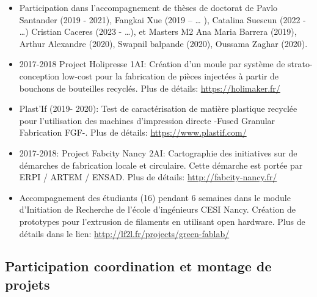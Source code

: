 \documentclass[
  11pt,
]{article}
\begin{document}
\begin{itemize}
\item
  Participation dans l'accompagnement de thèses de doctorat de Pavlo
  Santander (2019 - 2021), Fangkai Xue (2019 -- \ldots{} ), Catalina
  Suescun (2022 - \ldots) Cristian Caceres (2023 - \ldots), et Masters
  M2 Ana Maria Barrera (2019), Arthur Alexandre (2020), Swapnil balpande
  (2020), Oussama Zaghar (2020).
\item
  2017-2018 Project Holipresse 1AI: Création d'un moule par système de
  strato-conception low-cost pour la fabrication de pièces injectées à
  partir de bouchons de bouteilles recyclés. Plus de détails:
  \url{https://holimaker.fr/}
\item
  Plast'If (2019- 2020): Test de caractérisation de matière plastique
  recyclée pour l'utilisation des machines d'impression directe -Fused
  Granular Fabrication FGF-. Plus de détails:
  \url{https://www.plastif.com/}
\item
  2017-2018: Project Fabcity Nancy 2AI: Cartographie des initiatives sur
  de démarches de fabrication locale et circulaire. Cette démarche est
  portée par ERPI / ARTEM / ENSAD. Plus de détails:
  \url{http://fabcity-nancy.fr/}
\item
  Accompagnement des étudiants (16) pendant 6 semaines dans le module
  d'Initiation de Recherche de l'école d'ingénieurs CESI Nancy. Création
  de prototypes pour l'extrusion de filaments en utilisant open
  hardware. Plus de détails dans le lien:
  \url{http://lf2l.fr/projects/green-fablab/}
\end{itemize}

\hypertarget{participation-coordination-et-montage-de-projets}{%
\subsection{Participation coordination et montage de
projets}\label{participation-coordination-et-montage-de-projets}}
\end{document}
